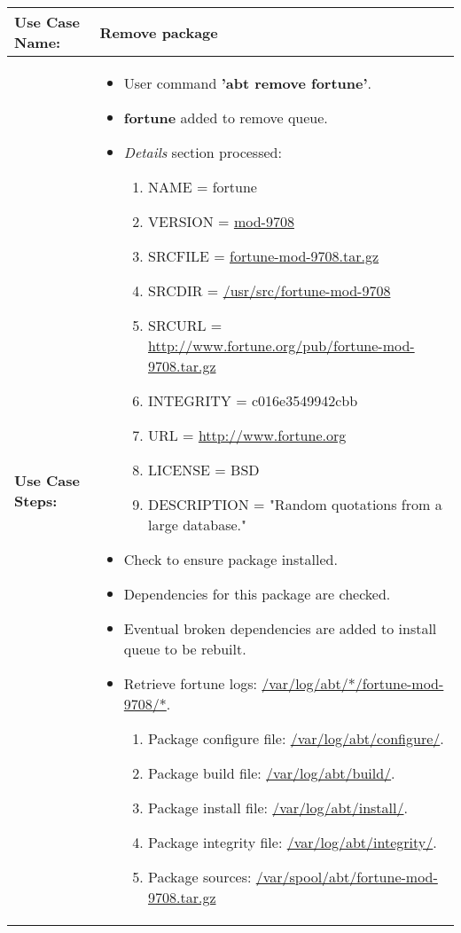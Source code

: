 \medskip

\begin{tabularx}{\linewidth}{|l|X|}
\hline
\textbf{Use Case Name:} & \textbf{Remove package} \\
\hline
\textbf{Use Case Steps:} & 
\begin{minipage}{\linewidth} 
  \vspace{0.05em}
  \begin{itemize}
    \item User command \textbf{'abt remove fortune'}.
    \item \textbf{fortune} added to remove queue.
    \item \emph{Details} section processed:
    \begin{enumerate}
      \item NAME = fortune
      \item VERSION = \url{mod-9708}
      \item SRCFILE = \url{fortune-mod-9708.tar.gz}
      \item SRCDIR = \url{/usr/src/fortune-mod-9708}
      \item SRCURL = \url{http://www.fortune.org/pub/fortune-mod-9708.tar.gz}
      \item INTEGRITY = c016e3549942cbb
      \item URL = \url{http://www.fortune.org}
      \item LICENSE = BSD
      \item DESCRIPTION = "Random quotations from a large database."
    \end{enumerate}
		\item Check to ensure package installed.
    \item Dependencies for this package are checked.
    \item Eventual broken dependencies are added to install queue to be rebuilt.
		\item Retrieve fortune logs: \url{/var/log/abt/*/fortune-mod-9708/*}.
		\begin{enumerate}
    	\item Package configure file: \url{/var/log/abt/configure/}.
    	\item Package build file: \url{/var/log/abt/build/}.
    	\item Package install file: \url{/var/log/abt/install/}.
    	\item Package integrity file: \url{/var/log/abt/integrity/}.
    	\item Package sources: \url{/var/spool/abt/fortune-mod-9708.tar.gz}

\end{enumerate}
\end{itemize}
\end{minipage}
\end{tabularx}
